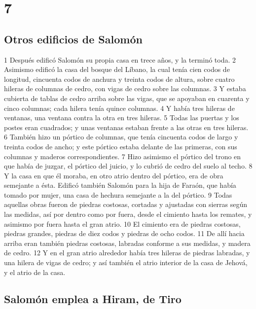 \chapter{7}

\section*{Otros edificios de Salomón}


1 Después edificó Salomón su propia casa en trece años, y la terminó toda.
2 Asimismo edificó la casa del bosque del Líbano, la cual tenía cien codos   de longitud, cincuenta codos de anchura y treinta codos de altura, sobre cuatro hileras de columnas de cedro, con vigas de cedro sobre las columnas.
3 Y estaba cubierta de tablas de cedro arriba sobre las vigas, que se apoyaban en cuarenta y cinco columnas; cada hilera tenía quince columnas.
4 Y había tres hileras de ventanas, una ventana contra la otra en tres hileras.
5 Todas las puertas y los postes eran cuadrados; y unas ventanas estaban frente a las otras en tres hileras.
6 También hizo un pórtico de columnas, que tenía cincuenta codos   de largo y treinta codos de ancho; y este pórtico estaba delante de las primeras, con sus columnas y maderos correspondientes.
7 Hizo asimismo el pórtico del trono en que había de juzgar, el pórtico del juicio, y lo cubrió de cedro del suelo al techo.
8 Y la casa en que él moraba, en otro atrio dentro del pórtico, era de obra semejante a ésta. Edificó también Salomón para la hija de Faraón, que había tomado por mujer, una casa de hechura semejante a la del pórtico.
9 Todas aquellas obras fueron de piedras costosas, cortadas y ajustadas con sierras según las medidas, así por dentro como por fuera, desde el cimiento hasta los remates, y asimismo por fuera hasta el gran atrio.
10 El cimiento era de piedras costosas, piedras grandes, piedras de diez codos   y piedras de ocho codos.
11 De allí hacia arriba eran también piedras costosas, labradas conforme a sus medidas, y madera de cedro.
12 Y en el gran atrio alrededor había tres hileras de piedras labradas, y una hilera de vigas de cedro; y así también el atrio interior de la casa de Jehová, y el atrio de la casa.
\section*{Salomón emplea a Hiram, de Tiro}

